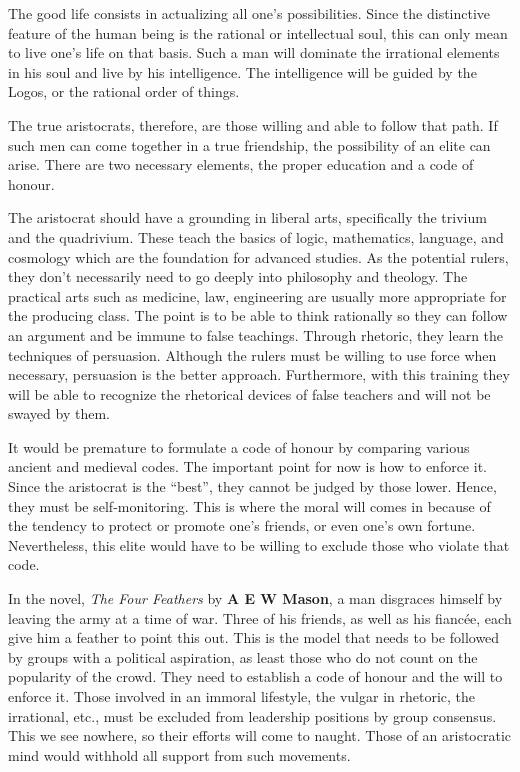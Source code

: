 The good life consists in actualizing all one's possibilities. Since the distinctive feature of the human being is the rational or intellectual soul, this can only mean to live one's life on that basis. Such a man will dominate the irrational elements in his soul and live by his intelligence. The intelligence will be guided by the Logos, or the rational order of things.

The true aristocrats, therefore, are those willing and able to follow that path. If such men can come together in a true friendship, the possibility of an elite can arise. There are two necessary elements, the proper education and a code of honour.

The aristocrat should have a grounding in liberal arts, specifically the trivium and the quadrivium. These teach the basics of logic, mathematics, language, and cosmology which are the foundation for advanced studies. As the potential rulers, they don't necessarily need to go deeply into philosophy and theology. The practical arts such as medicine, law, engineering are usually more appropriate for the producing class. The point is to be able to think rationally so they can follow an argument and be immune to false teachings. Through rhetoric, they learn the techniques of persuasion. Although the rulers must be willing to use force when necessary, persuasion is the better approach. Furthermore, with this training they will be able to recognize the rhetorical devices of false teachers and will not be swayed by them.

It would be premature to formulate a code of honour by comparing various ancient and medieval codes. The important point for now is how to enforce it. Since the aristocrat is the ``best'', they cannot be judged by those lower. Hence, they must be self-monitoring. This is where the moral will comes in because of the tendency to protect or promote one's friends, or even one's own fortune. Nevertheless, this elite would have to be willing to exclude those who violate that code.

In the novel, \emph{The Four Feathers} by \textbf{A E W Mason}, a man disgraces himself by leaving the army at a time of war. Three of his friends, as well as his fiancée, each give him a feather to point this out. This is the model that needs to be followed by groups with a political aspiration, as least those who do not count on the popularity of the crowd. They need to establish a code of honour and the will to enforce it. Those involved in an immoral lifestyle, the vulgar in rhetoric, the irrational, etc., must be excluded from leadership positions by group consensus. This we see nowhere, so their efforts will come to naught. Those of an aristocratic mind would withhold all support from such movements.

